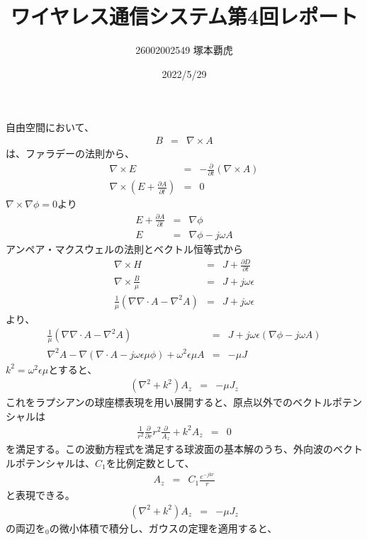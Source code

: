 \documentclass{article}
\title{ワイヤレス通信システム第4回レポート}
\author{26002002549 塚本覇虎}
\date{2022/5/29}
\begin{document}
\maketitle
自由空間において、
\begin{eqnarray*}
B &=& \nabla \times A
\end{eqnarray*}
は、ファラデーの法則から、
\begin{eqnarray*}
\nabla \times E &=& -\frac{\partial}{\partial t}(\nabla \times A)\\
 \nabla \times (E+\frac{\partial A}{\partial t})&=& 0
\end{eqnarray*}
$\nabla \times \nabla \phi = 0$より
\begin{eqnarray*}
E+\frac{\partial A}{\partial t}&=&\nabla \phi\\
E &=& \nabla \phi-j \omega A
\end{eqnarray*}
アンペア・マクスウェルの法則とベクトル恒等式から
\begin{eqnarray*}
\nabla \times H &=& J + \frac{\partial D}{\partial t}\\
\nabla \times \frac{B}{\mu} &=& J + j \omega \epsilon\\
\frac{1}{\mu}(\nabla\nabla\cdot A - \nabla^2 A)&=&J + j \omega \epsilon
\end{eqnarray*}
より、
\begin{eqnarray*}
\frac{1}{\mu}(\nabla\nabla\cdot A - \nabla^2 A)&=&J + j \omega \epsilon(\nabla\phi - j\omega A)\\
\nabla^2 A-\nabla(\nabla\cdot A -j \omega \epsilon \mu \phi ) + \omega^2 \epsilon \mu A &=& -\mu J
\end{eqnarray*}
$k^2 = \omega^2 \epsilon \mu$とすると、
\begin{eqnarray*}
(\nabla^2 + k^2)A_z &=& -\mu J_z
\end{eqnarray*}
これをラプシアンの球座標表現を用い展開すると、原点以外でのベクトルポテンシャルは
\begin{eqnarray*}
\frac{1}{r^2}\frac{\partial}{\partial r}r^2\frac{\partial}{A_z}+k^2 A_z &=& 0
\end{eqnarray*}
を満足する。この波動方程式を満足する球波面の基本解のうち、外向波のベクトルポテンシャルは、$C_1$を比例定数として、
\begin{eqnarray*}
A_z&=&C_1\frac{e^{-jkr}}{r}
\end{eqnarray*}
と表現できる。
\begin{eqnarray*}(\nabla^2 + k^2)A_z &=& -\mu J_z\end{eqnarray*}の両辺を$_0$の微小体積で積分し、ガウスの定理を適用すると、
\end{document}
